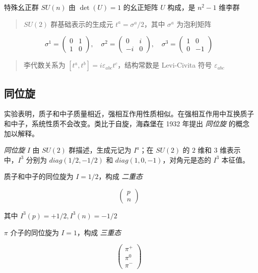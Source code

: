 \documentclass[oneside,a4paper,openany,11pt]{ctexbook}
\begin{document}
特殊幺正群 $SU(n)$ 由 $\det(U)=1$ 的幺正矩阵 $U$ 构成，是 $n^2 - 1$ 维李群

\begin{quote}
    $SU(2)$ 群基础表示的生成元 $t^a=\sigma^a/2$，其中 $\sigma^a$ 为泡利矩阵
\end{quote}

\begin{equation}
    \sigma^1 =
\begin{pmatrix}
    0 & 1 \\
    1 & 0
\end{pmatrix}, \quad
\sigma^2 =
\begin{pmatrix}
    0 & i \\
    -i & 0
\end{pmatrix}, \quad
\sigma^3 =
\begin{pmatrix}
    1 & 0 \\
    0 & -1
\end{pmatrix}
\end{equation}

\begin{quote}
    李代数关系为 $[t^a, t^b]=i \varepsilon_{abc} t^c$，结构常数是 Levi-Civita 符号 $\varepsilon_{abc}$
\end{quote}

\subsection{同位旋}

实验表明，质子和中子质量相近，强相互作用性质相似。在强相互作用中互换质子和中子，系统性质不会改变。类比于自旋，海森堡在 1932 年提出 \emph{同位旋} 的概念加以解释。

\emph{同位旋} $I$ 由 $SU(2)$ 群描述，生成元记为 $I^a$；在 $SU(2)$ 的 $2$ 维和 $3$ 维表示中，$I^3$ 分别为 $diag(1/2,-1/2)$ 和 $diag(1, 0,-1)$，对角元是态的 $I^3$ 本征值。

质子和中子的同位旋为 $I=1/2$，构成 \emph{二重态}

\begin{equation}
    \begin{pmatrix}
        p \\
        n
    \end{pmatrix}
\end{equation}

其中 $I^3(p)=+1/2, I^3(n)=-1/2$

$\pi$ 介子的同位旋为 $I=1$，构成 \emph{三重态}

\begin{equation}
    \begin{pmatrix}
        \pi^+ \\
        \pi^0 \\
        \pi^-
    \end{pmatrix}
\end{equation}
\end{document}
